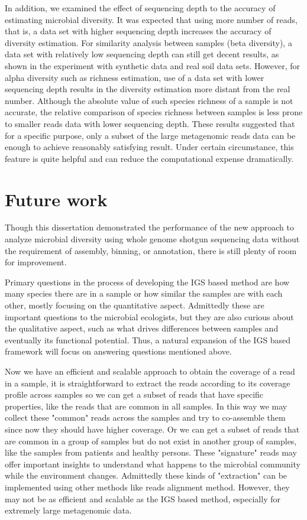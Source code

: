 In addition, we examined the effect of sequencing depth to the accuracy of 
estimating microbial diversity.
It was expected that using more number of reads, that is, a data set with higher sequencing
depth increases the accuracy of diversity estimation. For similarity analysis 
between samples (beta diversity), a data set with relatively
low sequencing depth can still get decent results, as shown in the experiment
with synthetic data and real soil data sets. However, for alpha diversity such as richness
estimation, use of a data set with lower sequencing depth results in the diversity estimation
more distant from the real number. Although the absolute value of such species
richness of a sample is not accurate, the relative comparison of species
richness between samples is less prone to smaller reads data with lower
sequencing depth. These results suggested that for a specific
purpose, only a subset of the large metagenomic reads data can be enough to
achieve reasonably satisfying result. Under certain circumstance, this feature
is quite helpful and can reduce the computational expense dramatically. 


\section{Future work}


Though this dissertation demonstrated the performance of the new approach to 
analyze microbial diversity
using whole genome shotgun sequencing data without the requirement of assembly,
binning, or annotation, there is still plenty of room for improvement.  

Primary questions in the process of developing the IGS based method are how many
species there are in a sample or how similar the samples are with each
other, mostly focusing on the quantitative aspect. Admittedly these are 
important questions to the microbial ecologists, but they are also
curious about the qualitative aspect, such as what drives differences between samples
and eventually its functional potential\cite{Xu2014}.  Thus, a natural 
expansion of the IGS based framework will focus on
answering questions mentioned above. 

Now we have an efficient and scalable approach to obtain the coverage of a read in
a sample, it is straightforward to extract the reads according to its coverage
profile across samples so we can get a subset of reads that have specific
properties, like the reads that are common in all samples. In this way we
may collect these "common" reads across the samples and try to co-assemble
them since now they should have higher coverage. Or we can get a subset of
reads that are common in a group of samples but do not exist in another group
of samples, like the samples from patients and healthy persons. These
"signature" reads may offer important insights to understand what happens
to the microbial community while the environment changes. Admittedly these
kinds of "extraction" can be implemented using other methods like reads 
alignment method. However, they may not be as efficient and scalable as the IGS
based method, especially for extremely large metagenomic data.



